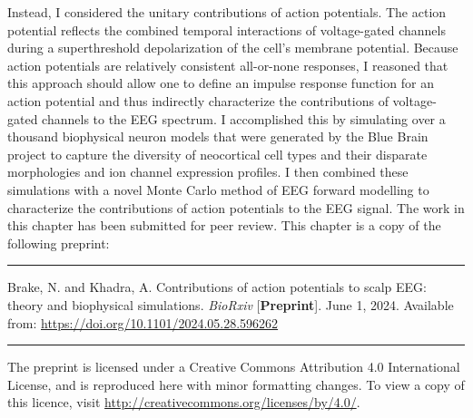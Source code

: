 Instead, I considered the unitary contributions of action potentials. The action potential reflects the combined temporal interactions of voltage-gated channels during a superthreshold depolarization of the cell's membrane potential. Because action potentials are relatively consistent all-or-none responses, I reasoned that this approach should allow one to define an impulse response function for an action potential and thus indirectly characterize the contributions of voltage-gated channels to the EEG spectrum. I accomplished this by simulating over a thousand biophysical neuron models that were generated by the Blue Brain project \cite{Markram2015} to capture the diversity of neocortical cell types and their disparate morphologies and ion channel expression profiles. I then combined these simulations with a novel Monte Carlo method of EEG forward modelling to characterize the contributions of action potentials to the EEG signal. The work in this chapter has been submitted for peer review. This chapter is a copy of the following preprint:

\vspace{1em}
\hrule
\vspace{.5em}
\noindent
\hangindent=1cm
Brake, N. and Khadra, A. Contributions of action potentials to scalp EEG: theory and biophysical simulations. \textit{BioRxiv} [\textbf{Preprint}]. June 1, 2024. Available from: \url{https://doi.org/10.1101/2024.05.28.596262}
\vspace{.75em}
\hrule
\vspace{.65em}

\noindent
The preprint is licensed under a Creative Commons Attribution 4.0 International License, and is reproduced here with minor formatting changes. To view a copy of this licence, visit \url{http://creativecommons.org/licenses/by/4.0/}.

\newpage

